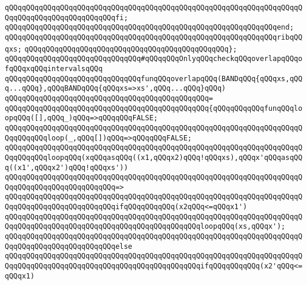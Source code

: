 \verb|qQQqqQQqqQQqqQQqqQQqqQQqqQQqqQQqqQQqqQQqqQQqqQQqqQQqqQQqqQQqqQQqqQQqqQQqqQQqqQQqqQQqqQQqqQQqqQQqfi;|\newline
\verb|qQQqqQQqqQQqqQQqqQQqqQQqqQQqqQQqqQQqqQQqqQQqqQQqqQQqqQQqqQQqqQQqend;|\newline
\newline
\verb|qQQqqQQqqQQqqQQqqQQqqQQqqQQqqQQqqQQqqQQqqQQqqQQqqQQqqQQqqQQqqQQqribqQQqxs;|\newline
\verb|qQQqqQQqqQQqqQQqqQQqqQQqqQQqqQQqqQQqqQQqqQQqqQQq};|\newline
\newline
\newline
\newline
\verb|qQQqqQQqqQQqqQQqqQQqqQQqqQQqqQQq#qQQqqQQqOnlyqQQqcheckqQQqoverlapqQQqofqQQqxqQQqintervalsqQQq|\newline
\newline
\verb|qQQqqQQqqQQqqQQqqQQqqQQqqQQqqQQqfunqQQqoverlapqQQq(BANDqQQq{qQQqxs,qQQq...qQQq},qQQqBANDqQQq{qQQqxs=>xs',qQQq...qQQq}qQQq)|\newline
\verb|qQQqqQQqqQQqqQQqqQQqqQQqqQQqqQQqqQQqqQQqqQQqqQQq=|\newline
\verb|qQQqqQQqqQQqqQQqqQQqqQQqqQQqqQQqqQQqqQQqqQQqqQQq{qQQqqQQqqQQqfunqQQqloopqQQq([],qQQq_)qQQq=>qQQqqQQqFALSE;|\newline
\verb|qQQqqQQqqQQqqQQqqQQqqQQqqQQqqQQqqQQqqQQqqQQqqQQqqQQqqQQqqQQqqQQqqQQqqQQqqQQqqQQqloop(_,qQQq[])qQQq=>qQQqqQQqFALSE;|\newline
\verb|qQQqqQQqqQQqqQQqqQQqqQQqqQQqqQQqqQQqqQQqqQQqqQQqqQQqqQQqqQQqqQQqqQQqqQQqqQQqqQQqloopqQQq(xqQQqasqQQq((x1,qQQqx2)qQQq!qQQqxs),qQQqx'qQQqasqQQq((x1',qQQqx2')qQQq!qQQqxs'))|\newline
\verb|qQQqqQQqqQQqqQQqqQQqqQQqqQQqqQQqqQQqqQQqqQQqqQQqqQQqqQQqqQQqqQQqqQQqqQQqqQQqqQQqqQQqqQQqqQQqqQQq=>|\newline
\verb|qQQqqQQqqQQqqQQqqQQqqQQqqQQqqQQqqQQqqQQqqQQqqQQqqQQqqQQqqQQqqQQqqQQqqQQqqQQqqQQqqQQqqQQqqQQqqQQqifqQQqqQQqqQQq(x2qQQq<=qQQqx1')|\newline
\newline
\verb|qQQqqQQqqQQqqQQqqQQqqQQqqQQqqQQqqQQqqQQqqQQqqQQqqQQqqQQqqQQqqQQqqQQqqQQqqQQqqQQqqQQqqQQqqQQqqQQqqQQqqQQqqQQqqQQqqQQqloopqQQq(xs,qQQqx');|\newline
\verb|qQQqqQQqqQQqqQQqqQQqqQQqqQQqqQQqqQQqqQQqqQQqqQQqqQQqqQQqqQQqqQQqqQQqqQQqqQQqqQQqqQQqqQQqqQQqqQQqelse|\newline
\verb|qQQqqQQqqQQqqQQqqQQqqQQqqQQqqQQqqQQqqQQqqQQqqQQqqQQqqQQqqQQqqQQqqQQqqQQqqQQqqQQqqQQqqQQqqQQqqQQqqQQqqQQqqQQqqQQqqQQqifqQQqqQQqqQQq(x2'qQQq<=qQQqx1)|\newline
